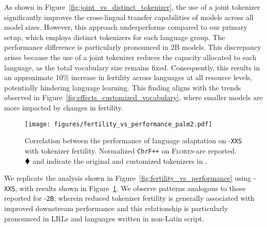 As shown in Figure~\ref{fig:joint_vs_distinct_tokenizer}, the use of a joint tokenizer significantly improves the cross-lingual transfer capabilities of \gemmatwo models across all model sizes. However, this approach underperforms compared to our primary setup, which employs distinct tokenizers for each language group. The performance difference is particularly pronounced in 2B models. This discrepancy arises because the use of a joint tokenizer reduces the capacity allocated to each language, as the total vocabulary size remains fixed. Consequently, this results in an approximate 10\% increase in fertility across languages at all resource levels, potentially hindering language learning. This finding aligns with the trends observed in Figure~\ref{fig:effects_customized_vocabulary}, where smaller models are more impacted by changes in fertility.

\begin{figure}[t]
    \setlength{\abovecaptionskip}{-0.0001cm}
    \setlength{\belowcaptionskip}{-0.35cm}
    \centering
    \texttt{[image: figures/fertility\_vs\_performance\_palm2.pdf]}
    \vspace{-8mm}
    \caption{Correlation between the performance of language adaptation on \palmtwo-\texttt{XXS} with tokenizer fertility. Normalized \texttt{ChrF++} on \textsc{Flores}-\sea are reported. {$\mathbin{\blacklozenge}$} and {\pfix}  indicate the original and customized tokenizers in \palmtwo.}
    \vspace{-6mm}
    \label{fig:fertility_vs_performance_palm2}
\end{figure}
We replicate the analysis shown in Figure~\ref{fig:fertility_vs_performance} using \palmtwo-\texttt{XXS}, with results shown in Figure~\ref{fig:fertility_vs_performance_palm2}. We observe patterns analogous to those reported for \gemmatwo-\texttt{2B}, wherein reduced tokenizer fertility is generally associated with improved downstream performance and this relationship is particularly pronounced in LRLs and languages written in non-Latin script.

